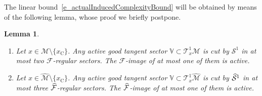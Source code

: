 \documentclass[10pt]{amsart}
\newtheorem{lemm}[theo]{Lemma}\newtheorem{prop}[theo]{Proposition}\newtheorem{coro}[theo]{Corollary}\newtheorem{conj}[theo]{Conjecture}
\theoremstyle{definition}\newtheorem{defi}[theo]{Definition}\newtheorem{rema}[theo]{Remark}\newtheorem{exam}[theo]{Example}\newtheorem{exem}[theo]{Example}\newtheorem{nota}[theo]{Notation}
\newcommand{\crit}{\mathrm{C}}
\newcommand{\xc}{x_\crit}
\newcommand{\tangu}{\mathcal{T}^1}
\newcommand{\cm}{\mathcal{F}}
\newcommand{\csp}{\mathcal{M}}
\newcommand{\cmp}{\hat\cm}
\newcommand{\cspi}{\widehat{\csp}}
\newcommand{\singPrivate}{\mathcal{S}}
\newcommand{\sing}[1]{\singPrivate^{#1}}
\newcommand{\singp}[1]{\hat{\singPrivate}^{#1}}
\newcommand{\cV}{\mathbb{V}}
\newcommand*{\relabel}{\renewcommand{\labelenumi}{(\theenumi)}}
\newcommand*{\alphenumi}{\renewcommand*{\theenumi}{\alph{enumi}}\relabel}
\let\oldhat\hat
\renewcommand*{\hat}[1]{\mathchoice{\widehat{#1}}{\widehat{#1}}{\oldhat{#1}}{\oldhat{#1}}}
\begin{document}
The linear bound~\eqref{e_actualInducedComplexityBound} will be obtained by means of the following lemma, whose proof we briefly postpone.

\pagebreak
\begin{lemm}\label{l_inductiveStep}
\leavevmode
\begin{enumerate}\alphenumi
\item \label{i_inductiveStep}
Let $x\in\csp\setminus\{\xc\}$. Any active good tangent sector $\cV\subset\tangu_x\csp$ is cut by $\sing1$ in at most two $\cm$-regular sectors. The $\cm$-image of at most one of them is active.
\item \label{i_inducedInductiveStep}
Let $x\in\cspi\setminus\{\xc\}$. Any active good tangent sector $\cV\subset\tangu_x\cspi$ is cut by $\singp1$ in at most three $\cmp$-regular sectors. The $\cmp$-image of at most one of them is active.
\end{enumerate}
\end{lemm} 
\end{document}
